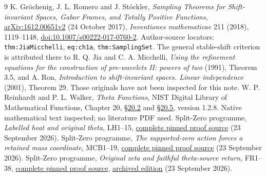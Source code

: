 \documentclass[11pt]{article}
\begin{document}
\begin{thebibliography}{9}
 K. Gr\"ochenig, J. L. Romero and J. St\"ockler,
\emph{Sampling Theorems for Shift-invariant Spaces, Gabor Frames, and Totally Positive Functions},
\href{https://arxiv.org/abs/1612.00651v2}{arXiv:1612.00651v2} (24 October 2017),
\emph{Inventiones mathematicae} 211 (2018), 1119--1148,
\href{https://doi.org/10.1007/s00222-017-0760-2}{doi:10.1007/s00222-017-0760-2}.
Author-source locators: \texttt{thm:JiaMicchelli}, \texttt{eq:ch1a}, \texttt{thm:SamplingSet}.
The general stable-shift criterion is attributed there to R. Q. Jia and C. A. Micchelli, \emph{Using the refinement equations for the construction of pre-wavelets II: powers of two} (1991), Theorem 3.5, and A. Ron, \emph{Introduction to shift-invariant spaces. Linear independence} (2001), Theorem 29. Those originals have not been inspected for this note.
 W. P. Reinhardt and P. L. Walker, \emph{Theta Functions},
NIST Digital Library of Mathematical Functions, Chapter 20,
\href{https://dlmf.nist.gov/20.2}{\S20.2} and
\href{https://dlmf.nist.gov/20.5}{\S20.5}, version 1.2.8.
Native mathematical text inspected; no literature PDF used.
 Split-Zero programme, \emph{Labelled heat and original theta}, LH1--15,
\href{https://github.com/KokunoYumeto/zeta-function-research-reader/blob/50abbb837ebee5f3786e67e7ecdec3d42dee0043/workbenches/splitzero-tandem/continuations/20260923-integer-heat-observation/sources/LABELLED_HEAT_AND_ORIGINAL_THETA.tex}{complete pinned proof source} (23 September 2026).
 Split-Zero programme, \emph{The supported-zero action forces a retained mass coordinate}, MCB1--19,
\href{https://github.com/KokunoYumeto/zeta-function-research-reader/blob/50abbb837ebee5f3786e67e7ecdec3d42dee0043/workbenches/splitzero-tandem/continuations/20260923-integer-heat-observation/sources/SUPPORTED_ZERO_MASS_COMPLETION.tex}{complete pinned proof source} (23 September 2026).
 Split-Zero programme, \emph{Original zeta and faithful theta-source return}, FR1--38,
\href{https://github.com/KokunoYumeto/zeta-function-research-reader/blob/ec73ac350d0cda3d95c0bd1361bede33166b4d34/workbenches/splitzero-tandem/continuations/20260923-original-zeta-return/NOTE.tex}{complete pinned proof source},
\href{https://doi.org/10.5281/zenodo.22911205}{archived edition} (23 September 2026).
\end{thebibliography}
\end{document}
